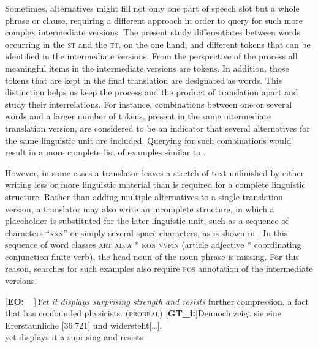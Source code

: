 \documentclass[output=paper]{LSP/langsci}
\begin{document}
Sometimes, alternatives might fill not only one part of speech slot but a whole phrase or clause, requiring a different approach in order to query for such more complex intermediate versions. The present study differentiates between words occurring in the \textsc{st} and the \textsc{tt}, on the one hand, and different tokens that can be identified in the intermediate versions. From the perspective of the process all meaningful items in the intermediate versions are tokens. In addition, those tokens that are kept in the final translation are designated as words. This distinction helps us keep the process and the product of translation apart and study their interrelations. For instance, combinations between one or several words and a larger number of tokens, present in the same intermediate translation version, are considered to be an indicator that several alternatives for the same linguistic unit are included. Querying for such combinations would result in a more complete list of examples similar to .
 
However, in some cases a translator leaves a stretch of text unfinished by either writing less or more linguistic material than is required for a complete linguistic structure. Rather than adding multiple alternatives to a single translation version, a translator may also write an incomplete structure, in which a placeholder is substituted for the later linguistic unit, such as a sequence of characters “xxx” or simply several space characters, as is shown in . In this sequence of word classes \textsc{art} \textsc{adja} * \textsc{kon} \textsc{vvfin} (article adjective * coordinating conjunction finite verb), the head noun of the noun phrase is missing. For this reason, searches for such examples also require \textsc{pos} annotation of the intermediate versions.



\ea \label{ex:1:5}
\begin{xlist}
\exi{}[\textbf{EO:~~}]{\emph{Yet it displays surprising strength and resists} further compression, a fact that has confounded physicists. (\textsc{probral})}
\exi{}[\textbf{GT\_i:}]{\gll  Denno\stern{}ch\raute\stern\stern\stern\stern\stern{} zeigt\stern\raute{} sie\raute{} eine\raute{} Er\pfeil\pfeil\pfeil\raute{}erstaun\stern\stern{}liche\raute{} [\stern{}36.721] \raute\raute\stern{} und\raute\stern\stern\stern\stern\stern\stern{} widersteht[{\dots}].\\
 yet displays it a suprising\raute{}\raute{}\raute{} {} \raute{}\raute{} and resists \\
}
\end{xlist}
\z
\end{document}
